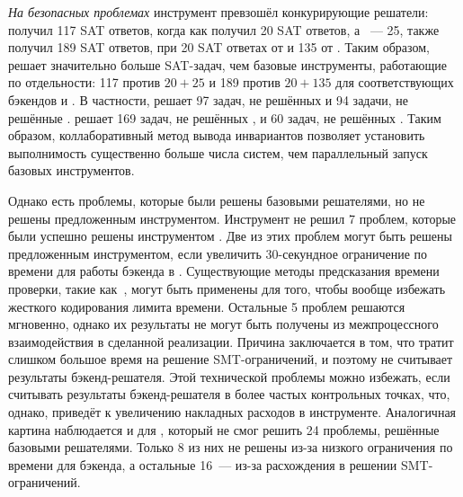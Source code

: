 \textit{На безопасных проблемах} инструмент \theringenCICI{} превзошёл конкурирующие решатели: \ringenCICI{\cvc{}} получил 117 SAT ответов, когда как \racer{} получил 20 SAT ответов, а \ringen{\cvc{}}~--- 25, также \ringenCICI{\vampire{}} получил 189 SAT ответов, при 20 SAT ответах от \racer{} и 135 от \ringen{\vampire{}}. 
Таким образом, \theringenCICI{} решает значительно больше SAT-задач, чем базовые инструменты, работающие по отдельности: 117 против $20+25$ и 189 против $20+135$ для соответствующих бэкендов \cvc{} и \vampire{}.
В частности, \ringenCICI{\cvc{}} решает 97 задач, не решённых \racer{} и 94 задачи, не решённые \ringen{\cvc{}}.
\ringenCICI{\vampire{}} решает 169 задач, не решённых \racer{}, и 60 задач, не решённых \ringen{\vampire{}}.
Таким образом, коллаборативный метод вывода инвариантов позволяет установить выполнимость существенно больше числа систем, чем параллельный запуск базовых инструментов.

Однако есть проблемы, которые были решены базовыми решателями, но не решены предложенным инструментом. Инструмент \ringenCICI{\cvc{}} не решил 7 проблем, которые были успешно решены инструментом \ringen{\cvc{}}. Две из этих проблем могут быть решены предложенным инструментом, если увеличить 30-секундное ограничение по времени для работы бэкенда в \theringenCICI{}. Существующие методы предсказания времени проверки, такие как~\cite{10.1145/3121257.3121262}, могут быть применены для того, чтобы вообще избежать жесткого кодирования лимита времени. Остальные 5 проблем решаются мгновенно, однако их результаты не могут быть получены из межпроцессного взаимодействия в сделанной реализации. Причина заключается в том, что \racer{} тратит слишком большое время на решение SMT-ограничений, и поэтому не считывает результаты бэкенд-решателя. Этой технической проблемы можно избежать, если считывать результаты бэкенд-решателя в более частых контрольных точках, что, однако, приведёт к увеличению накладных расходов в инструменте. Аналогичная картина наблюдается и для \ringenCICI{\vampire{}}, который не смог решить 24 проблемы, решённые базовыми решателями. Только 8 из них не решены из-за низкого ограничения по времени для бэкенда, а остальные 16~--- из-за расхождения \racer{} в решении SMT-ограничений.


